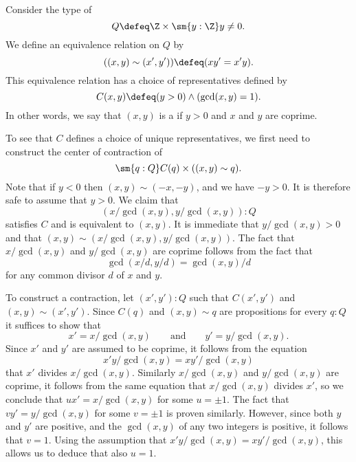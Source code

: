 \begin{eg}
  Consider the type of 
  \begin{equation*}
    Q\defeq \Z\times\sm{y:\Z}y\neq 0.
  \end{equation*}
  We define an equivalence relation on $Q$ by
  \begin{equation*}
    ((x,y)\sim (x',y'))\defeq (xy'=x'y).
  \end{equation*}
  This equivalence relation has a choice of representatives defined by
  \begin{equation*}
    C(x,y)\defeq (y>0)\land (\gcd(x,y)=1). 
  \end{equation*}
  In other words, we say that $(x,y)$ is a  if $y>0$ and $x$ and $y$ are coprime. 

  To see that $C$ defines a choice of unique representatives, we first need to construct the center of contraction of
  \begin{equation*}
    \sm{q:Q}C(q)\times ((x,y)\sim q).
  \end{equation*}
  Note that if $y<0$ then $(x,y)\sim (-x,-y)$, and we have $-y>0$. It is therefore safe to assume that $y>0$. We claim that
  \begin{equation*}
    (x/\gcd(x,y),y/\gcd(x,y)):Q
  \end{equation*}
  satisfies $C$ and is equivalent to $(x,y)$. It is immediate that $y/\gcd(x,y)>0$ and that $(x,y)\sim(x/\gcd(x,y),y/\gcd(x,y))$. The fact that $x/\gcd(x,y)$ and $y/\gcd(x,y)$ are coprime follows from the fact that
  \begin{equation*}
    \gcd(x/d,y/d)=\gcd(x,y)/d
  \end{equation*}
  for any common divisor $d$ of $x$ and $y$. 
  
  To construct a contraction, let $(x',y'):Q$ such that $C(x',y')$ and $(x,y)\sim (x',y')$. Since $C(q)$ and $(x,y)\sim q$ are propositions for every $q:Q$ it suffices to show that
  \begin{equation*}
    x'=x/\gcd(x,y)\qquad\text{and}\qquad y'=y/\gcd(x,y).
  \end{equation*}
  Since $x'$ and $y'$ are assumed to be coprime, it follows from the equation
  \begin{equation*}
    x'y/\gcd(x,y)=xy'/\gcd(x,y)
  \end{equation*}
  that $x'$ divides $x/\gcd(x,y)$. Similarly $x/\gcd(x,y)$ and $y/\gcd(x,y)$ are coprime, it follows from the same equation that $x/\gcd(x,y)$ divides $x'$, so we conclude that $ux'=x/\gcd(x,y)$ for some $u=\pm 1$. The fact that $vy'=y/\gcd(x,y)$ for some $v=\pm 1$ is proven similarly. However, since both $y$ and $y'$ are positive, and the $\gcd(x,y)$ of any two integers is positive, it follows that $v=1$. Using the assumption that $x'y/\gcd(x,y)=xy'/\gcd(x,y)$, this allows us to deduce that also $u=1$.


\end{eg}

